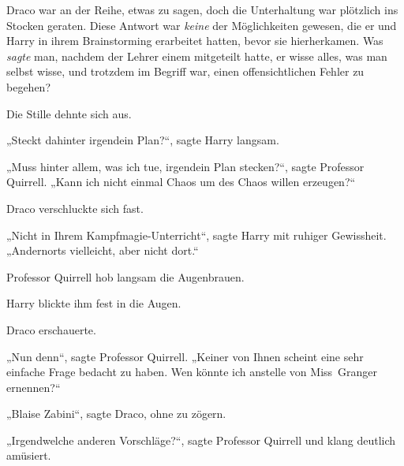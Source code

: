 Draco war an der Reihe, etwas zu sagen, doch die Unterhaltung war plötzlich ins Stocken geraten. Diese Antwort war \emph{keine} der Möglichkeiten gewesen, die er und Harry in ihrem Brainstorming erarbeitet hatten, bevor sie hierherkamen. Was \emph{sagte} man, nachdem der Lehrer einem mitgeteilt hatte, er wisse alles, was man selbst wisse, und trotzdem im Begriff war, einen offensichtlichen Fehler zu begehen?

Die Stille dehnte sich aus.

„Steckt dahinter irgendein Plan?“, sagte Harry langsam.

„Muss hinter allem, was ich tue, irgendein Plan stecken?“, sagte Professor Quirrell.
„Kann ich nicht einmal Chaos um des Chaos willen erzeugen?“

Draco verschluckte sich fast.

„Nicht in Ihrem Kampfmagie-Unterricht“, sagte Harry mit ruhiger Gewissheit.
„Andernorts vielleicht, aber nicht dort.“

Professor Quirrell hob langsam die Augenbrauen.

Harry blickte ihm fest in die Augen.

Draco erschauerte.

„Nun denn“, sagte Professor Quirrell.
„Keiner von Ihnen scheint eine sehr einfache Frage bedacht zu haben. Wen könnte ich anstelle von Miss~Granger ernennen?“

„Blaise Zabini“, sagte Draco, ohne zu zögern.

„Irgendwelche anderen Vorschläge?“, sagte Professor Quirrell und klang deutlich amüsiert.

